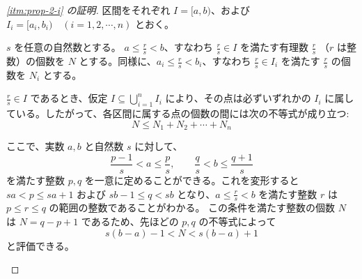 \documentclass[article,paper=a4paper]{jlreq}
\begin{document}
\begin{proof}[\ref{itm:prop-2-i} の証明]
区間をそれぞれ $I=[a,b)$、および $I_i=[a_i,b_i) \quad (i=1,2,\cdots,n)$ とおく。

$s$ を任意の自然数とする。
$a \leq \frac{r}{s} < b$、すなわち $\frac{r}{s} \in I$ を満たす有理数 $\frac{r}{s}$ （$r$ は整数）の個数を $N$ とする。同様に、$a_i \leq \frac{r}{s} < b_i$、すなわち $\frac{r}{s} \in I_i$ を満たす $\frac{r}{s}$ の個数を $N_i$ とする。

$\frac{r}{s} \in I$ であるとき、仮定 $I \subseteq \bigcup_{i=1}^{n} I_i$ により、その点は必ずいずれかの $I_i$ に属している。したがって、各区間に属する点の個数の間には次の不等式が成り立つ:
\[
 N \leq N_1 + N_2 + \cdots + N_n
\]

ここで、実数 $a, b$ と自然数 $s$ に対して、
\[
 \frac{p-1}{s} < a \leq \frac{p}{s}, \qquad \frac{q}{s} < b \leq \frac{q+1}{s}
\]
を満たす整数 $p, q$ を一意に定めることができる。これを変形すると $sa < p \leq sa + 1$ および $sb - 1 \leq q < sb$ となり、$a \leq \frac{r}{s} < b$ を満たす整数 $r$ は $p \leq r \leq q$ の範囲の整数であることがわかる。
この条件を満たす整数の個数 $N$ は $N = q - p + 1$ であるため、先ほどの $p, q$ の不等式によって
\[
 s(b-a) - 1 < N < s(b-a) + 1
\]
と評価できる。

\begin{center}
\end{center}


\end{proof}
\end{document}
